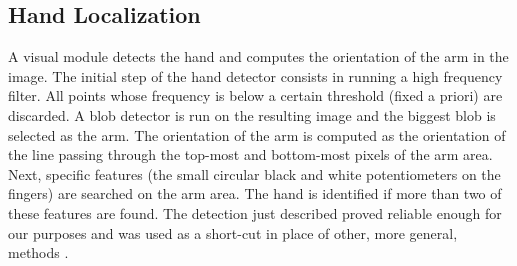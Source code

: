 \subsection{Hand Localization}
A visual module detects the hand and computes the orientation of
the arm in the image. The initial step of the hand detector
consists in running a high frequency filter. All points whose
frequency is below a certain threshold (fixed a priori) are
discarded. A blob detector is run on the resulting image and the
biggest blob is selected as the arm. The orientation of the arm is
computed as the orientation of the line passing through the
top-most and bottom-most pixels of the arm area. Next, specific
features (the small circular black and white potentiometers on the
fingers) are searched on the arm area. The hand is identified if
more than two of these features are found. The detection just
described proved reliable enough for our purposes and was used as
a short-cut in place of other, more general, methods
\cite{metta03early,natale05from}.

